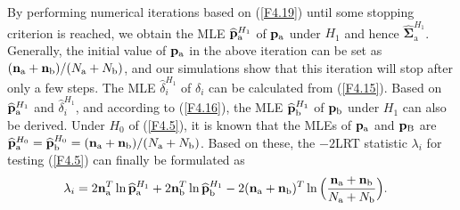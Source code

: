 By performing numerical iterations based on (\ref{F4.19}) until some stopping
criterion is reached, we obtain the MLE $\widehat{\bf p}^{H_1}_{\mathrm{a}}$ of
${\bf p}_{\mathrm{a}}$ under $H_1$ and hence
$\widehat{\bm\Sigma}^{H_1}_{\mathrm{a}}$. Generally, the initial value of ${\bf
p}_{\mathrm{a}}$ in the above iteration can be set as $({\bf n}_{\mathrm{a}}+{\bf
n}_{\mathrm{b}})/(N_{\mathrm{a}}+N_{\mathrm{b}})$, and our simulations show that
this iteration will stop after only a few steps. The MLE $\hat{\delta}^{H_1}_i$ of
$\delta_i$ can be calculated from (\ref{F4.15}). Based on $\widehat{\bf
p}^{H_1}_{\mathrm{a}}$ and $\hat{\delta}^{H_1}_i$, and according to (\ref{F4.16}),
the MLE $\widehat{\bf p}^{H_1}_{\mathrm{b}}$ of ${\bf p}_{\mathrm{b}}$ under $H_1$
can also be derived. Under $H_0$ of (\ref{F4.5}), it is known that the MLEs of ${\bf
p}_{\mathrm{a}}$ and ${\bf p}_{\mathrm{B}}$ are $\widehat{\bf
p}^{H_0}_{\mathrm{a}}=\widehat{\bf p}^{H_0}_{\mathrm{b}}=({\bf n}_{\mathrm{a}}+{\bf
n}_{\mathrm{b}})/(N_{\mathrm{a}}+N_{\mathrm{b}})$. Based on these, the $-2$LRT
statistic $\lambda_i$ for testing (\ref{F4.5}) can finally be formulated as
\begin{align}\label{F4.20}
\lambda_i&=2{\bf n}_{\mathrm{a}}^T\ln\widehat{\bf p}^{H_1}_{\mathrm{a}}+2{\bf
n}_{\mathrm{b}}^T\ln\widehat{\bf p}^{H_1}_{\mathrm{b}}-2({\bf n}_{\mathrm{a}}+{\bf
n}_{\mathrm{b}})^T\ln\Big(\frac{{\bf n}_{\mathrm{a}}+{\bf
n}_{\mathrm{b}}}{N_{\mathrm{a}}+N_{\mathrm{b}}}\Big).
\end{align}
